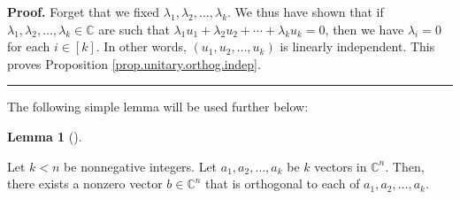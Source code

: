 \documentclass[numbers=enddot,12pt,final,onecolumn,notitlepage]{scrartcl}%
\numberwithin{exer}{subsection}
\theoremstyle{definition}
\newtheorem{lem}[theo]{Lemma}
\newenvironment{lemma}[1][]
{\begin{lem}[#1]\begin{leftbar}}
{\end{leftbar}\end{lem}}
\newenvironment{proof}[1][Proof]{\noindent\textbf{#1.} }{\ \rule{0.5em}{0.5em}}
\begin{document}
\begin{proof}
Forget that we fixed $\lambda_{1},\lambda_{2},\ldots,\lambda_{k}$. We thus
have shown that if $\lambda_{1},\lambda_{2},\ldots,\lambda_{k}\in\mathbb{C}$
are such that $\lambda_{1}u_{1}+\lambda_{2}u_{2}+\cdots+\lambda_{k}u_{k}=0$,
then we have $\lambda_{i}=0$ for each $i\in\left[  k\right]  $. In other
words, $\left(  u_{1},u_{2},\ldots,u_{k}\right)  $ is linearly independent.
This proves Proposition \ref{prop.unitary.orthog.indep}.
\end{proof}

The following simple lemma will be used further below:

\begin{lemma}
\label{lem.unitary.orthog.one-more}Let $k<n$ be nonnegative integers. Let
$a_{1},a_{2},\ldots,a_{k}$ be $k$ vectors in $\mathbb{C}^{n}$. Then, there
exists a nonzero vector $b\in\mathbb{C}^{n}$ that is orthogonal to each of
$a_{1},a_{2},\ldots,a_{k}$.
\end{lemma}
\end{document}
